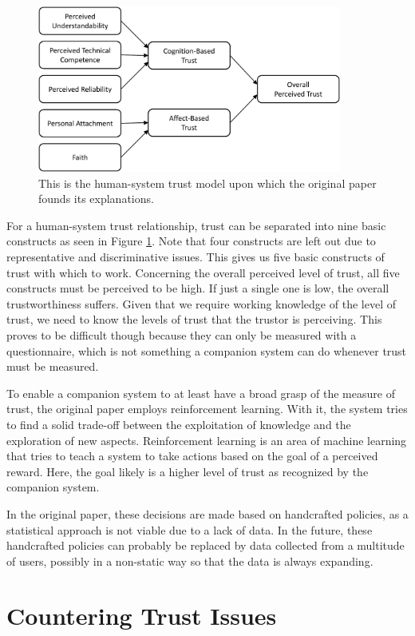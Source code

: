 \documentclass[a4paper]{article}
\begin{document}
\begin{figure}[H]
	\centering
	\includegraphics[width=10cm]{trust.png}
	\caption{This is the human-system trust model upon which the original paper founds its explanations.}
	\label{fig:hs_trust}
\end{figure}

For a human-system trust relationship, trust can be separated into nine basic constructs as seen in Figure \ref{fig:hs_trust}. Note that four constructs are left out due to representative and discriminative issues. This gives us five basic constructs of trust with which to work. Concerning the overall perceived level of trust, all five constructs must be perceived to be high. If just a single one is low, the overall trustworthiness suffers. Given that we require working knowledge of the level of trust, we need to know the levels of trust that the trustor is perceiving. This proves to be difficult though because they can only be measured with a questionnaire, which is not something a companion system can do whenever trust must be measured.

To enable a companion system to at least have a broad grasp of the measure of trust, the original paper employs reinforcement learning. With it, the system tries to find a solid trade-off between the exploitation of knowledge and the exploration of new aspects. Reinforcement learning is an area of machine learning that tries to teach a system to take actions based on the goal of a perceived reward. Here, the goal likely is a higher level of trust as recognized by the companion system.

In the original paper, these decisions are made based on handcrafted policies, as a statistical approach is not viable due to a lack of data. In the future, these handcrafted policies can probably be replaced by data collected from a multitude of users, possibly in a non-static way so that the data is always expanding.

\section{Countering Trust Issues}
\end{document}
